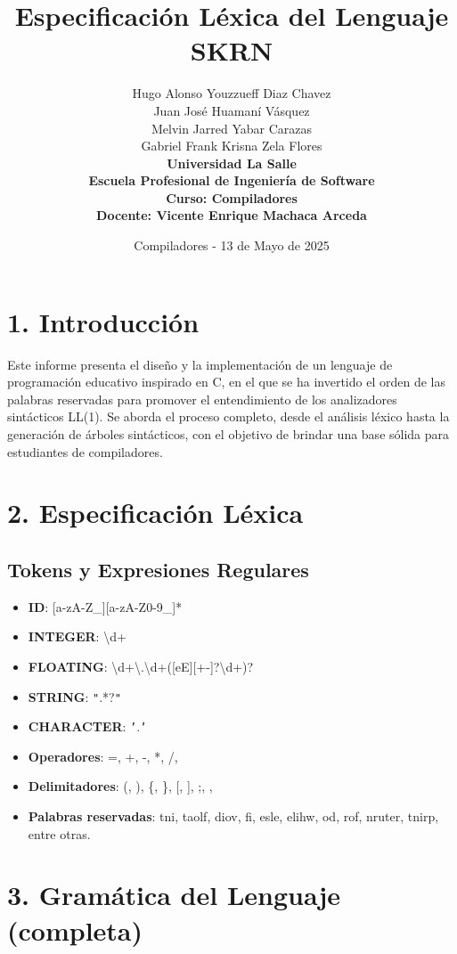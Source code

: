 \documentclass[12pt]{article}
\title{
    \vspace*{3cm} %
    \textbf{\Huge Especificación Léxica del Lenguaje SKRN} \\[2cm]
}
\author{
    \Large
    Hugo Alonso Youzzueff Diaz Chavez\\[0.5em]
    Juan José Huamaní Vásquez\\[0.5em]
    Melvin Jarred Yabar Carazas\\[0.5em]
    Gabriel Frank Krisna Zela Flores\\[2cm]
    \textbf{Universidad La Salle}\\[0.5em]
    \textbf{Escuela Profesional de Ingeniería de Software}\\[0.5em]
    \textbf{Curso: Compiladores}\\[0.5em]
    \textbf{Docente: Vicente Enrique Machaca Arceda}\\[3cm]
}
\date{\Large Compiladores - 13 de Mayo de 2025}
\begin{document}
\maketitle

\newpage


\section*{1. Introducción}
Este informe presenta el diseño y la implementación de un lenguaje de programación educativo inspirado en C, en el que se ha invertido el orden de las palabras reservadas para promover el entendimiento de los analizadores sintácticos LL(1). Se aborda el proceso completo, desde el análisis léxico hasta la generación de árboles sintácticos, con el objetivo de brindar una base sólida para estudiantes de compiladores.

\section*{2. Especificación Léxica}

\subsection*{Tokens y Expresiones Regulares}
\begin{itemize}
  \item \textbf{ID}: [a-zA-Z\_][a-zA-Z0-9\_]*
  \item \textbf{INTEGER}: \textbackslash d+
  \item \textbf{FLOATING}: \textbackslash d+\textbackslash.\textbackslash d+([eE][+-]?\textbackslash d+)?
  \item \textbf{STRING}: \texttt{"}.*?\texttt{"}
  \item \textbf{CHARACTER}: \texttt{'}.\texttt{'}
  \item \textbf{Operadores}: =, +, -, *, /, %
  \item \textbf{Delimitadores}: (, ), \{, \}, [, ], ;, ,
  \item \textbf{Palabras reservadas}: tni, taolf, diov, fi, esle, elihw, od, rof, nruter, tnirp, entre otras.
\end{itemize}

\section*{3. Gramática del Lenguaje (completa)}
\end{document}
